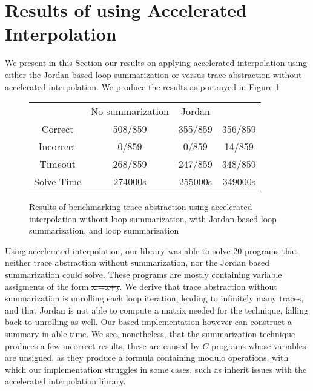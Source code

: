 \section{Results of using Accelerated Interpolation}
We present in this Section our results on applying accelerated interpolation using either the Jordan based loop summarization or \qvasr versus trace abstraction without accelerated interpolation. We produce the results as portrayed in Figure \ref{table_acc}
\begin{figure}[H]
	\centering
		\begin{tabular}{cccc}
			\toprule
			& No summarization & Jordan & \qvasr \\
			\cmidrule{1-4}
			Correct & 508/859 & 355/859 & 356/859\\
			Incorrect & 0/859 & 0/859 & 14/859\\
			Timeout & 268/859 & 247/859 & 348/859 \\
			Solve Time &  274000s & 255000s & 349000s
		\end{tabular}
	\label{table_acc}
	\caption{Results of benchmarking trace abstraction using accelerated interpolation without loop summarization, with Jordan based loop summarization, and \qvasr loop summarization}
\end{figure}
Using accelerated interpolation, our \qvasr library was able to solve 20 programs that neither trace abstraction without summarization, nor the Jordan based summarization could solve. These programs are mostly containing variable assigments of the form \st{x:=x+y}. We derive that trace abstraction without summarization is unrolling each loop iteration, leading to infinitely many traces, and that Jordan is not able to compute a matrix needed for the technique, falling back to unrolling as well. Our \qvasr based implementation however can construct a summary in able time. We see, nonetheless, that the \qvasr summarization technique produces a few incorrect results, these are caused by $C$ programs whose variables are unsigned, as they produce a formula containing modulo operations, with which our \qvasr implementation struggles in some cases, such as inherit issues with the accelerated interpolation library.

